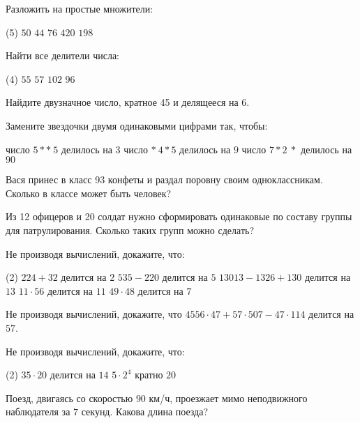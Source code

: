 \begin{class}[number=4]
	\begin{listofex}
	\item Разложить на простые множители:
	\begin{tasks}(5)
		\task \( 50 \)
		\task \( 44 \)
		\task \( 76 \)
		\task \( 420 \)
		\task \( 198 \)
	\end{tasks}
	\item Найти все делители числа:
	\begin{tasks}(4)
		\task \( 55 \)
		\task \( 57 \)
		\task \( 102 \)
		\task \( 96 \)
	\end{tasks}
	\item Найдите двузначное число, кратное 45 и делящееся на 6.
	\item Замените звездочки двумя одинаковыми цифрами так, чтобы:
	\begin{tasks}
		\task число \( 5**\:5 \) делилось на \( 3 \)
		\task число \( *\:4*5 \) делилось на \( 9 \)
		\task число \( 7*2\:* \) делилось на \( 90 \)
	\end{tasks}
	\item Вася принес в класс 93 конфеты и раздал поровну своим одноклассникам. Сколько в классе может быть человек?
	\item Из 12 офицеров и 20 солдат нужно сформировать одинаковые по составу группы для патрулирования. Сколько таких групп можно сделать?
	\item Не производя вычислений, докажите, что:
	\begin{tasks}(2)
		\task \( 224+32 \) делится на \( 2 \)
		\task \( 535-220 \) делится на \( 5 \)
		\task \( 13013-1326+130 \) делится на \( 13 \)
		\task \( 11\cdot56 \) делится на \( 11 \)
		\task \( 49\cdot48 \) делится на \( 7 \)
	\end{tasks}
	\item Не производя вычислений, докажите, что \( 4556\cdot47+57\cdot507-47\cdot114 \) делится на \( 57 \).
	\item Не производя вычислений, докажите, что:
	\begin{tasks}(2)
		\task \( 35\cdot20 \) делится на \( 14 \)
		\task \( 5\cdot2^4 \) кратно \( 20 \)
	\end{tasks}
	\item Поезд, двигаясь со скоростью \( 90 \) км/ч, проезжает мимо неподвижного наблюдателя за \( 7 \) секунд. Какова длина поезда?
	\end{listofex}
\end{class}

